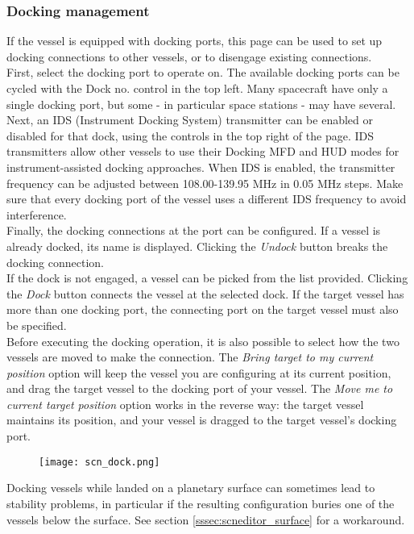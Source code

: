 \documentclass[Orbiter User Manual.tex]{subfiles}
\begin{document}
\subsubsection{Docking management}
If the vessel is equipped with docking ports, this page can be used to set up docking connections to other vessels, or to disengage existing connections.\\
First, select the docking port to operate on. The available docking ports can be cycled with the Dock no. control in the top left. Many spacecraft have only a single docking port, but some - in particular space stations - may have several.\\
Next, an IDS (Instrument Docking System) transmitter can be enabled or disabled for that dock, using the controls in the top right of the page. IDS transmitters allow other vessels to use their Docking MFD and HUD modes for instrument-assisted docking approaches. When IDS is enabled, the transmitter frequency can be adjusted between 108.00-139.95 MHz in 0.05 MHz steps. Make sure that every docking port of the vessel uses a different IDS frequency to avoid interference.\\
Finally, the docking connections at the port can be configured. If a vessel is already docked, its name is displayed. Clicking the \textit{Undock} button breaks the docking connection.\\
If the dock is not engaged, a vessel can be picked from the list provided. Clicking the \textit{Dock} button connects the vessel at the selected dock. If the target vessel has more than one docking port, the connecting port on the target vessel must also be specified.\\
Before executing the docking operation, it is also possible to select how the two vessels are moved to make the connection. The \textit{Bring target to my current position} option will keep the vessel you are configuring at its current position, and drag the target vessel to the docking port of your vessel. The \textit{Move me to current target position} option works in the reverse way: the target vessel maintains its position, and your vessel is dragged to the target vessel's docking port.

\begin{figure}[H]
	\centering
	\texttt{[image: scn\_dock.png]}
\end{figure}

\noindent
Docking vessels while landed on a planetary surface can sometimes lead to stability problems, in particular if the resulting configuration buries one of the vessels below the surface. See section \ref{sssec:scneditor_surface} for a workaround.
\end{document}
